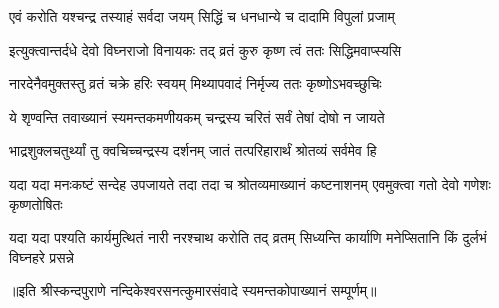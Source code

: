 \begin{center}
\twolineshloka
{एवं करोति यश्चन्द्र तस्याहं सर्वदा जयम्}
{सिद्धिं च धनधान्ये च दादामि विपुलां प्रजाम्}%

\twolineshloka
{इत्युक्त्वान्तर्दधे देवो विघ्नराजो विनायकः}
{तद् व्रतं कुरु कृष्ण त्वं ततः सिद्धिमवाप्स्यसि}%

\twolineshloka
{नारदेनैवमुक्तस्तु व्रतं चक्रे हरिः स्वयम्}
{मिथ्यापवादं निर्मृज्य ततः कृष्णोऽभवच्छुचिः}%

\twolineshloka
{ये शृण्वन्ति तवाख्यानं स्यमन्तकमणीयकम्}
{चन्द्रस्य चरितं सर्वं तेषां दोषो न जायते}%

\twolineshloka
{भाद्रशुक्लचतुर्थ्यां तु क्वचिच्चन्द्रस्य दर्शनम्}
{जातं तत्परिहारार्थं श्रोतव्यं सर्वमेव हि}%

\threelineshloka
{यदा यदा मनःकष्टं सन्देह उपजायते} 
{तदा तदा च श्रोतव्यमाख्यानं कष्टनाशनम्}
{एवमुक्त्वा गतो देवो गणेशः कृष्णतोषितः}%

\fourlineindentedshloka
{यदा यदा पश्यति कार्यमुत्थितं}
{नारी नरश्चाथ करोति तद् व्रतम्}
{सिध्यन्ति कार्याणि मनेप्सितानि}
{किं दुर्लभं विघ्नहरे प्रसन्ने}%

\end{center}

॥इति श्रीस्कन्दपुराणे नन्दिकेश्वरसनत्कुमारसंवादे स्यमन्तकोपाख्यानं सम्पूर्णम्॥

